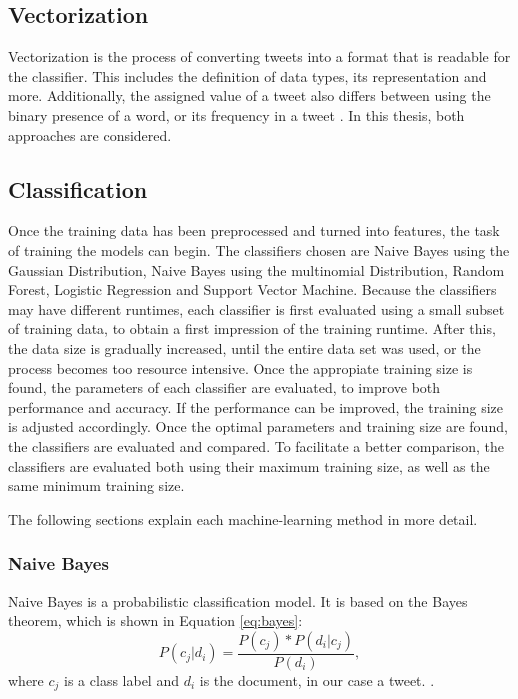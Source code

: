 \subsection{Vectorization}
Vectorization is the process of converting tweets into a format that is readable for the classifier. This includes the definition of data types, its representation and more. Additionally, the assigned value of a tweet also differs between using the binary presence of a word, or its frequency in a tweet \cite{DBLP:journals/csur/GiachanouC16}. In this thesis, both approaches are considered.

\subsection{Classification}
Once the training data has been preprocessed and turned into features, the task of training the models can begin. The classifiers chosen are Naive Bayes using the Gaussian Distribution, Naive Bayes using the multinomial Distribution, Random Forest, Logistic Regression and Support Vector Machine. Because the classifiers may have different runtimes, each classifier is first evaluated using a small subset of training data, to obtain a first impression of the training runtime. After this, the data size is gradually increased, until the entire data set was used, or the process becomes too resource intensive. Once the appropiate training size is found, the parameters of each classifier are evaluated, to improve both performance and accuracy. If the performance can be improved, the training size is adjusted accordingly. Once the optimal parameters and training size are found, the classifiers are evaluated and compared. To facilitate a better comparison, the classifiers are evaluated both using their maximum training size, as well as the same minimum training size.

The following sections explain each machine-learning method in more detail.

    \subsubsection{Naive Bayes}
        Naive Bayes is a probabilistic classification model. It is based on the Bayes theorem, which is shown in Equation \eqref{eq:bayes}:
        \begin{equation}
            \label{eq:bayes}
            P(c_j|d_i) = \frac{P(c_j) * P(d_i|c_j)}{P(d_i)},
        \end{equation}
        where $c_j$ is a class label and $d_i$ is the document, in our case a tweet. \cite{DBLP:books/aw/TanSKK2019}. 
        
